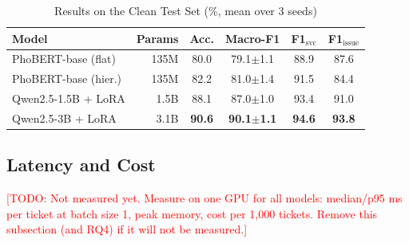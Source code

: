 \documentclass[conference]{IEEEtran}
\newcommand{\TODO}[1]{\textcolor{red}{[TODO: #1]}}
\newcommand{\pmstd}[2]{#1{\scriptsize$\pm$#2}}
\begin{document}
\begin{table}[htbp]
\caption{Results on the Clean Test Set (\%, mean over 3 seeds)}
\label{tab:main}
\centering
\setlength{\tabcolsep}{3.5pt}
\begin{tabular}{lrcccc}
\toprule
\textbf{Model} & \textbf{Params} & \textbf{Acc.} & \textbf{Macro-F1} & \textbf{F1$_\text{svc}$} & \textbf{F1$_\text{issue}$} \\
\midrule
PhoBERT-base (flat)  & 135M & 80.0 & \pmstd{79.1}{1.1} & 88.9 & 87.6 \\
PhoBERT-base (hier.) & 135M & 82.2 & \pmstd{81.0}{1.4} & 91.5 & 84.4 \\
Qwen2.5-1.5B + LoRA  & 1.5B & 88.1 & \pmstd{87.0}{1.0} & 93.4 & 91.0 \\
Qwen2.5-3B + LoRA    & 3.1B & \textbf{90.6} & \textbf{\pmstd{90.1}{1.1}} & \textbf{94.6} & \textbf{93.8} \\
\bottomrule
\end{tabular}
\end{table}

\subsection{Latency and Cost}
\TODO{Not measured yet. Measure on one GPU for all models: median/p95 ms per
ticket at batch size 1, peak memory, cost per 1{,}000 tickets. Remove this
subsection (and RQ4) if it will not be measured.}
\end{document}
